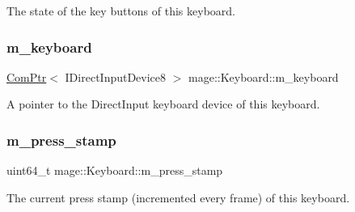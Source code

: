 The state of the key buttons of this keyboard. \hypertarget{classmage_1_1_keyboard_a992b8b8caf0d858163e5e9af04302324}{}\label{classmage_1_1_keyboard_a992b8b8caf0d858163e5e9af04302324} 
\subsubsection{\texorpdfstring{m\+\_\+keyboard}{m\_keyboard}}
{\footnotesize\ttfamily \hyperlink{namespacemage_ae74f374780900893caa5555d1031fd79}{Com\+Ptr}$<$ I\+Direct\+Input\+Device8 $>$ mage\+::\+Keyboard\+::m\+\_\+keyboard\hspace{0.3cm}{\ttfamily [private]}}

A pointer to the Direct\+Input keyboard device of this keyboard. \hypertarget{classmage_1_1_keyboard_a2c638a93d1f61d9d3578a0df8b6a1c39}{}\label{classmage_1_1_keyboard_a2c638a93d1f61d9d3578a0df8b6a1c39} 
\subsubsection{\texorpdfstring{m\+\_\+press\+\_\+stamp}{m\_press\_stamp}}
{\footnotesize\ttfamily uint64\+\_\+t mage\+::\+Keyboard\+::m\+\_\+press\+\_\+stamp\hspace{0.3cm}{\ttfamily [private]}}

The current press stamp (incremented every frame) of this keyboard. 